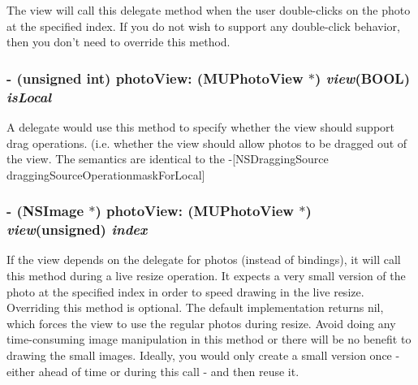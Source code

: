 The view will call this delegate method when the user double-clicks on the photo at the specified index. If you do not wish to support any double-click behavior, then you don't need to override this method. 
\subsubsection{\setlength{\rightskip}{0pt plus 5cm}- (unsigned int) photo\-View: ({\bf MUPhoto\-View} $\ast$) {\em view}(BOOL) {\em is\-Local}}\label{category_n_s_object(_m_u_photo_view_delegate)_42f4131dee120657b393067d35c7c771}


A delegate would use this method to specify whether the view should support drag operations. (i.e. whether the view should allow photos to be dragged out of the view. The semantics are identical to the -[NSDragging\-Source dragging\-Source\-Operationmask\-For\-Local] 
\subsubsection{\setlength{\rightskip}{0pt plus 5cm}- (NSImage $\ast$) photo\-View: ({\bf MUPhoto\-View} $\ast$) {\em view}(unsigned) {\em index}}\label{category_n_s_object(_m_u_photo_view_delegate)_3d71f3823ce78a353981136fbc18075f}


If the view depends on the delegate for photos (instead of bindings), it will call this method during a live resize operation. It expects a very small version of the photo at the specified index in order to speed drawing in the live resize. Overriding this method is optional. The default implementation returns nil, which forces the view to use the regular photos during resize. Avoid doing any time-consuming image manipulation in this method or there will be no benefit to drawing the small images. Ideally, you would only create a small version once - either ahead of time or during this call - and then reuse it. 
